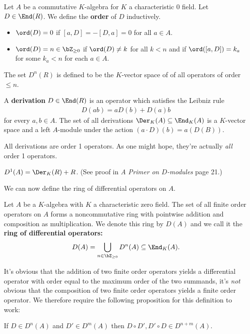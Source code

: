 \begin{defn}\label{def:order-of-operator}
	Let $A$ be a commutative $K$-algebra for $K$ a characteristic 0 field. Let $D \in \End(R)$. We define the \textbf{order} of $D$ inductively.
	\begin{itemize}
		\item $\ord(D) = 0$ if $[a,D] = -[D,a] = 0$ for all $a \in A$.
		\item $\ord(D) = n \in \bZ_{\geq 0}$ if $\ord(D) \neq k$ for all $k < n$ and if $\ord([a,D]) = k_a$ for some $k_a < n$ for each $a \in A$. 
	\end{itemize}
	The set $D^n(R)$ is defined to be the  $K$-vector space of of all operators of order $ \leq n$. 
\end{defn}
\begin{defn}\label{def:derivation}
	A \textbf{derivation} $D \in \End(R)$ is an operator which satisfies the Leibniz rule
	\begin{align*}
		D(ab) = aD(b) + D(a)b
	\end{align*}
	for every $a,b \in A$. The set of all derivations $\Der_K(A) \subseteq \End_K(A)$ is a $K$-vector space and a left $A$-module under the action $(a\cdot D)(b) = a(D(B))$.
\end{defn}
All derivations are order 1 operators. As one might hope, they're actually \emph{all} order 1 operators.
\begin{lem}\label{lem:derivations-are-order-one}
	$D^1(A) = \Der_K(R) + R$. (See proof in \emph{A Primer on $D$-modules} page 21.)
\end{lem}
We can now define the ring of differential operators on $A$.
\begin{defn}\label{defn:ring-of-diff-ops}
	Let $A$ be a $K$-algebra with $K$ a characteristic zero field. The set of all finite order operators on $A$ forms a noncommutative ring with pointwise addition and composition as multiplication. We denote this ring by $D(A)$ and we call it the \textbf{ring of differential operators:}
	\begin{align*}
		D(A) = \bigcup_{n \in \bZ_{\geq 0}} D^n(A) \subseteq \End_K(A).
	\end{align*}
\end{defn}
It's obvious that the addition of two finite order operators yields a differential operator with order equal to the maximum order of the two summands, it's \emph{not} obvious that the composition of two finite order operators yields a finite order operator. We therefore require the following proposition for this definition to work:
\begin{prop}\label{prop:composition-of-operators}
	If $D \in D^n(A)$ and $D' \in D^m(A)$ then $D\circ D', D' \circ D \in D^{n+m}(A)$.
\end{prop}




